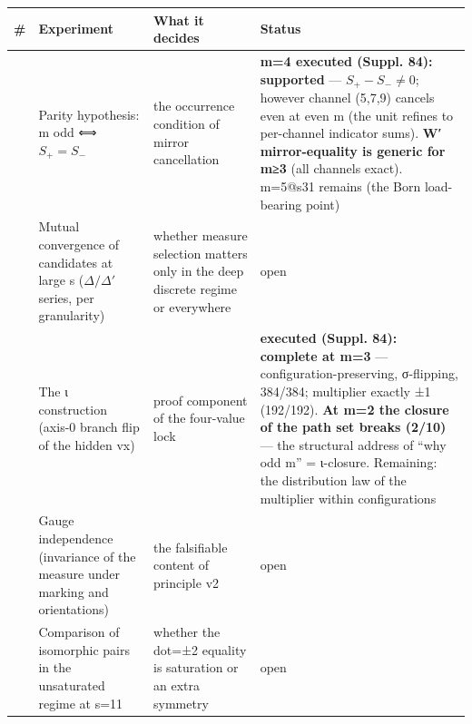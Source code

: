 \documentclass[
]{article}
\newcounter{none} %
\begin{document}
{\def\LTcaptype{none} %
\begin{longtable}[]{@{}
  >{\raggedright\arraybackslash}p{}
  >{\raggedright\arraybackslash}p{}
  >{\raggedright\arraybackslash}p{}
  >{\raggedright\arraybackslash}p{}@{}}
\toprule\noalign{}
\begin{minipage}[b]{\linewidth}\raggedright
\#
\end{minipage} & \begin{minipage}[b]{\linewidth}\raggedright
Experiment
\end{minipage} & \begin{minipage}[b]{\linewidth}\raggedright
What it decides
\end{minipage} & \begin{minipage}[b]{\linewidth}\raggedright
Status
\end{minipage} \\
\midrule\noalign{}
\endhead
\bottomrule\noalign{}
\endlastfoot
1 & Parity hypothesis: m odd ⟺ \(S_+=S_-\) & the occurrence condition of
mirror cancellation & \textbf{m=4 executed (Suppl. 84): supported} ---
\(S_+-S_-\neq0\); however channel (5,7,9) cancels even at even m (the
unit refines to per-channel indicator sums). \textbf{W′ mirror-equality
is generic for m≥3} (all channels exact). m=5@s31 remains (the Born
load-bearing point) \\
2 & Mutual convergence of candidates at large s (\(\Delta/\Delta'\)
series, per granularity) & whether measure selection matters only in the
deep discrete regime or everywhere & open \\
3 & The ι construction (axis-0 branch flip of the hidden vx) & proof
component of the four-value lock & \textbf{executed (Suppl. 84):
complete at m=3} --- configuration-preserving, σ-flipping, 384/384;
multiplier exactly ±1 (192/192). \textbf{At m=2 the closure of the path
set breaks (2/10)} --- the structural address of ``why odd m'' =
ι-closure. Remaining: the distribution law of the multiplier within
configurations \\
4 & Gauge independence (invariance of the measure under marking and
orientations) & the falsifiable content of principle v2 & open \\
5 & Comparison of isomorphic pairs in the unsaturated regime at s=11 &
whether the dot=±2 equality is saturation or an extra symmetry & open \\
\end{longtable}
}
\end{document}
